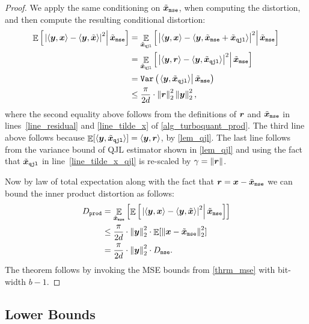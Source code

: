 \documentclass[11pt]{article}
\begin{document}
\begin{proof}
We apply the same conditioning on $\tilde{{\bm x}}_{\tt mse}$, when computing the distortion, and then compute the resulting conditional distortion:
\begin{align*}
    \mathop{{\mathbb{E}}}\left[\left. \left| \langle {\bm y}, {\bm x} \rangle - \langle {\bm y}, \tilde{{\bm x}} \rangle \right|^2 \right| \tilde{{\bm x}}_{\tt mse} \right] &= \mathop{{\mathbb{E}}}_{\tilde{{\bm x}}_{\tt qjl}}\left[\left. \left| \langle {\bm y}, {\bm x} \rangle - \langle {\bm y}, \tilde{{\bm x}}_{\tt mse} + \tilde{{\bm x}}_{\tt qjl} \rangle \right|^2 \right| \tilde{{\bm x}}_{\tt mse} \right] \\
    &= \mathop{{\mathbb{E}}}_{\tilde{{\bm x}}_{\tt qjl}}\left[\left. \left| \langle {\bm y}, {\bm r} \rangle - \langle {\bm y}, \tilde{{\bm x}}_{\tt qjl} \rangle \right|^2 \right| \tilde{{\bm x}}_{\tt mse} \right] \\
    &= \mathtt{Var} \left( \left. \langle {\bm y}, \tilde{{\bm x}}_{\tt qjl} \rangle \right| \tilde{{\bm x}}_{\tt mse} \right) \\
    &\le \frac{\pi}{2d} \cdot \left\| {\bm r} \right\|_2^2 \left\| {\bm y} \right\|_2^2,
\end{align*}
where the second equality above follows from the definitions of ${\bm r}$ and $\tilde{{\bm x}}_{\tt mse}$ in lines~\ref{line_residual} and \ref{line_tilde_x} of \cref{alg_turboquant_prod}.
The third line above follows because $\mathop{{\mathbb{E}}}[\langle {\bm y}, \tilde{{\bm x}}_{\tt qjl} \rangle] = \langle {\bm y}, {\bm r} \rangle$, by \cref{lem_qjl}. 
The last line follows from the variance bound of QJL estimator shown in \cref{lem_qjl} and using the fact that $\tilde{{\bm x}}_{\tt qjl}$ in line~\ref{line_tilde_x_qjl} is re-scaled by $\gamma = \left\| {\bm r} \right\|$.

Now by law of total expectation along with the fact that ${\bm r} = {\bm x} - \tilde{{\bm x}}_{\tt mse}$ we can bound the inner product distortion as follows:
\begin{align*}
    D_{\tt prod} &= \mathop{{\mathbb{E}}}_{\tilde{{\bm x}}_{\tt mse}} \left[ \mathop{{\mathbb{E}}}\left[\left. \left| \langle {\bm y}, {\bm x} \rangle - \langle {\bm y}, \tilde{{\bm x}} \rangle \right|^2 \right| \tilde{{\bm x}}_{\tt mse} \right] \right]\\
    &\le \frac{\pi}{2 d} \cdot \left\| {\bm y} \right\|_2^2 \cdot \mathop{{\mathbb{E}}}[\left\| {\bm x} - \tilde{{\bm x}}_{\tt mse} \right\|_2^2]\\
    &= \frac{\pi}{2 d} \cdot \left\| {\bm y} \right\|_2^2 \cdot D_{\tt mse}.
\end{align*}
The theorem follows by invoking the MSE bounds from \cref{thrm_mse} with bit-width $b-1$.
\end{proof}

\subsection{Lower Bounds}
\label{sec:lower_bound}
\end{document}
